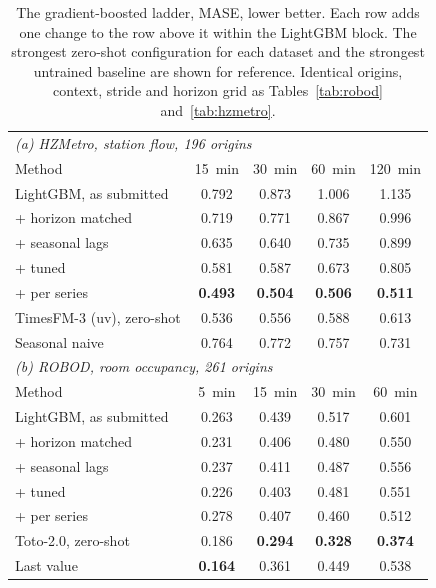 \documentclass[11pt]{article}
\theoremstyle{plain}
\theoremstyle{definition}
\theoremstyle{remark}
\newcommand{\best}[1]{\textbf{#1}}
\newif\ifrevisionmarkup
\newcommand{\new}[1]{\ifrevisionmarkup\textcolor{revision}{#1}\else#1\fi}
\begin{document}
\new{\begin{table}[htbp]
\centering
\caption{\new{The gradient-boosted ladder, MASE, lower better. Each row adds one change to the row above it within the LightGBM block. The strongest zero-shot configuration for each dataset and the strongest untrained baseline are shown for reference. Identical origins, context, stride and horizon grid as Tables~\ref{tab:robod} and~\ref{tab:hzmetro}.}}
\label{tab:lgbm}
\small
\begin{tabular}{lcccc}
\toprule
\multicolumn{5}{l}{\emph{(a) HZMetro, station flow, \num{196} origins}}\\
Method & \SI{15}{\minute} & \SI{30}{\minute} & \SI{60}{\minute} & \SI{120}{\minute} \\
\midrule
LightGBM, as submitted      & 0.792 & 0.873 & 1.006 & 1.135 \\
\quad + horizon matched     & 0.719 & 0.771 & 0.867 & 0.996 \\
\quad + seasonal lags       & 0.635 & 0.640 & 0.735 & 0.899 \\
\quad + tuned               & 0.581 & 0.587 & 0.673 & 0.805 \\
\quad + per series          & \best{0.493} & \best{0.504} & \best{0.506} & \best{0.511} \\
\midrule
TimesFM-3 (uv), zero-shot   & 0.536 & 0.556 & 0.588 & 0.613 \\
Seasonal naive              & 0.764 & 0.772 & 0.757 & 0.731 \\
\midrule
\multicolumn{5}{l}{\emph{(b) ROBOD, room occupancy, \num{261} origins}}\\
Method & \SI{5}{\minute} & \SI{15}{\minute} & \SI{30}{\minute} & \SI{60}{\minute} \\
\midrule
LightGBM, as submitted      & 0.263 & 0.439 & 0.517 & 0.601 \\
\quad + horizon matched     & 0.231 & 0.406 & 0.480 & 0.550 \\
\quad + seasonal lags       & 0.237 & 0.411 & 0.487 & 0.556 \\
\quad + tuned               & 0.226 & 0.403 & 0.481 & 0.551 \\
\quad + per series          & 0.278 & 0.407 & 0.460 & 0.512 \\
\midrule
Toto-2.0, zero-shot         & 0.186 & \best{0.294} & \best{0.328} & \best{0.374} \\
Last value                  & \best{0.164} & 0.361 & 0.449 & 0.538 \\
\bottomrule
\end{tabular}
\end{table}}
\end{document}
